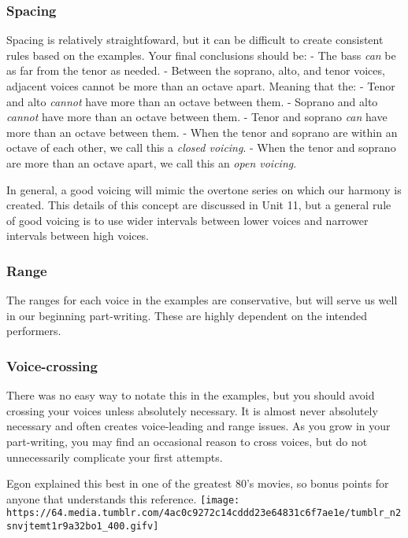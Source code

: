 \documentclass{book}
\begin{document}
\hypertarget{spacing}{%
\subsubsection{Spacing}\label{spacing}}

Spacing is relatively straightfoward, but it can be difficult to create
consistent rules based on the examples. Your final conclusions should be: -
The bass \emph{can} be as far from the tenor as needed. - Between the soprano,
alto, and tenor voices, adjacent voices cannot be more than an octave apart.
Meaning that the: - Tenor and alto \emph{cannot} have more than an octave
between them. - Soprano and alto \emph{cannot} have more than an octave
between them. - Tenor and soprano \emph{can} have more than an octave between
them. - When the tenor and soprano are within an octave of each other, we call
this a \emph{closed voicing}. - When the tenor and soprano are more than an
octave apart, we call this an \emph{open voicing}.

In general, a good voicing will mimic the overtone series on which our harmony
is created. This details of this concept are discussed in Unit 11, but a
general rule of good voicing is to use wider intervals between lower voices
and narrower intervals between high voices.

\hypertarget{range}{%
\subsubsection{Range}\label{range}}

The ranges for each voice in the examples are conservative, but will serve us
well in our beginning part-writing. These are highly dependent on the intended
performers.

\hypertarget{voice-crossing}{%
\subsubsection{Voice-crossing}\label{voice-crossing}}

There was no easy way to notate this in the examples, but you should avoid
crossing your voices unless absolutely necessary. It is almost never
absolutely necessary and often creates voice-leading and range issues. As you
grow in your part-writing, you may find an occasional reason to cross voices,
but do not unnecessarily complicate your first attempts.

Egon explained this best in one of the greatest 80's movies, so bonus points
for anyone that understands this reference.
\texttt{[image: https://64.media.tumblr.com/4ac0c9272c14cddd23e64831c6f7ae1e/tumblr\_n2snvjtemt1r9a32bo1\_400.gifv]}
\end{document}
